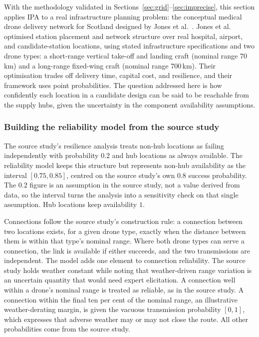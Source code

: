 \documentclass[preprint,12pt]{elsarticle}
\begin{document}
With the methodology validated in Sections~\ref{sec:grid}--\ref{sec:imprecise}, this section applies IPA to a real infrastructure planning problem: the conceptual medical drone delivery network for Scotland designed by Jones et al.~\cite{jones_drone_2025}. Jones et al. optimised station placement and network structure over real hospital, airport, and candidate-station locations, using stated infrastructure specifications and two drone types: a short-range vertical take-off and landing craft (nominal range 70\,km) and a long-range fixed-wing craft (nominal range 700\,km). Their optimisation trades off delivery time, capital cost, and resilience, and their framework uses point probabilities. The question addressed here is how confidently each location in a candidate design can be said to be reachable from the supply hubs, given the uncertainty in the component availability assumptions.

\subsubsection{Building the reliability model from the source study}\label{sec:provenance}

The source study's resilience analysis treats non-hub locations as failing independently with probability $0.2$ and hub locations as always available. The reliability model keeps this structure but represents non-hub availability as the interval $[0.75,0.85]$, centred on the source study's own $0.8$ success probability. The $0.2$ figure is an assumption in the source study, not a value derived from data, so the interval turns the analysis into a sensitivity check on that single assumption. Hub locations keep availability $1$.

Connections follow the source study's construction rule: a connection between two locations exists, for a given drone type, exactly when the distance between them is within that type's nominal range. Where both drone types can serve a connection, the link is available if either succeeds, and the two transmissions are independent. The model adds one element to connection reliability. The source study holds weather constant while noting that weather-driven range variation is an uncertain quantity that would need expert elicitation. A connection well within a drone's nominal range is treated as reliable, as in the source study. A connection within the final ten per cent of the nominal range, an illustrative weather-derating margin, is given the vacuous transmission probability $[0,1]$, which expresses that adverse weather may or may not close the route. All other probabilities come from the source study.
\end{document}
